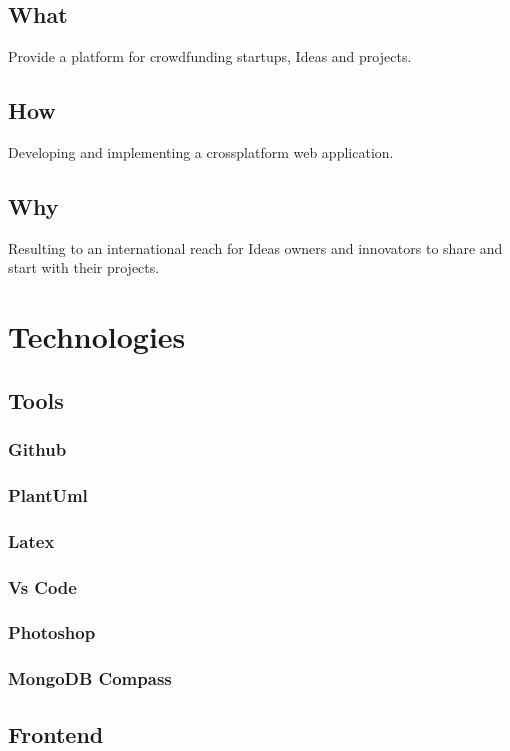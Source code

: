 \documentclass[11pt, openany]{report}
\begin{document}
\section{What}
Provide a platform for crowdfunding startups, Ideas and projects.
\section{How}
Developing and implementing a crossplatform web application.
\section{Why}
Resulting to an international reach for Ideas owners and innovators to share and start with their projects.

\chapter{ Technologies }
  \section{ Tools }
    \subsection{ Github }
    
    \subsection{ PlantUml }

    \subsection{ Latex }

    \subsection{ Vs Code }

    \subsection{ Photoshop }

    \subsection{ MongoDB Compass}

  \section{Frontend}
\end{document}
